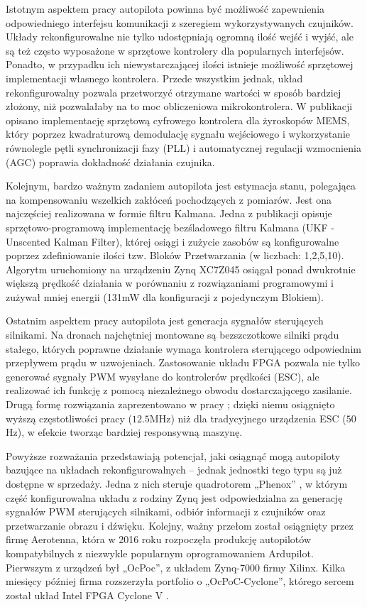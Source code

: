 Istotnym aspektem pracy autopilota powinna być możliwość zapewnienia odpowiedniego interfejsu komunikacji z szeregiem wykorzystywanych czujników. Układy rekonfigurowalne nie tylko udostępniają ogromną ilość wejść i wyjść, ale są też często wyposażone w sprzętowe kontrolery dla popularnych interfejsów. Ponadto, w przypadku ich niewystarczającej ilości istnieje możliwość sprzętowej implementacji własnego kontrolera. Przede wszystkim jednak, układ rekonfigurowalny pozwala przetworzyć otrzymane wartości w sposób bardziej złożony, niż pozwalałaby na to moc obliczeniowa mikrokontrolera. W publikacji \cite{MEMS} opisano implementację sprzętową cyfrowego kontrolera dla żyroskopów MEMS, który poprzez kwadraturową demodulację sygnału wejściowego i wykorzystanie równolegle pętli synchronizacji fazy (PLL) i automatycznej regulacji wzmocnienia (AGC) poprawia dokładność działania czujnika.

Kolejnym, bardzo ważnym zadaniem autopilota jest estymacja stanu, polegająca na kompensowaniu wszelkich zakłóceń pochodzących z pomiarów. Jest ona najczęściej realizowana w formie filtru Kalmana. Jedna z publikacji \cite{SohKalman} opisuje sprzętowo-programową implementację bezśladowego filtru Kalmana (UKF - Unscented Kalman Filter), której osiągi i zużycie zasobów są konfigurowalne poprzez zdefiniowanie ilości tzw. Bloków Przetwarzania (w liczbach: 1,2,5,10). Algorytm uruchomiony na urządzeniu Zynq XC7Z045 osiągał ponad dwukrotnie większą prędkość działania w porównaniu z rozwiązaniami programowymi i zużywał mniej energii (131mW dla konfiguracji z pojedynczym Blokiem). 

Ostatnim aspektem pracy autopilota jest generacja sygnałów sterujących silnikami. Na dronach najchętniej montowane są bezszczotkowe silniki prądu stałego, których poprawne działanie wymaga kontrolera sterującego odpowiednim przepływem prądu w uzwojeniach. Zastosowanie układu FPGA pozwala nie tylko generować sygnały PWM wysyłane do kontrolerów prędkości (ESC), ale realizować ich funkcję z pomocą niezależnego obwodu dostarczającego zasilanie. Drugą formę rozwiązania zaprezentowano w pracy \cite{ESC}; dzięki niemu osiągnięto wyższą częstotliwości pracy ($12.5$MHz) niż dla tradycyjnego urządzenia ESC ($50$Hz), w efekcie tworząc bardziej responsywną maszynę.

Powyższe rozważania przedstawiają potencjał, jaki osiągnąć mogą autopiloty bazujące na układach rekonfigurowalnych -- jednak jednostki tego typu są już dostępne w sprzedaży. Jedna z nich steruje quadrotorem „Phenox” \cite{Konomura}, w którym część konfigurowalna układu z rodziny Zynq jest odpowiedzialna za generację sygnałów PWM sterujących silnikami, odbiór informacji z czujników oraz przetwarzanie obrazu i dźwięku.
Kolejny, ważny przełom został osiągnięty przez firmę Aerotenna, która w 2016 roku rozpoczęła produkcję autopilotów kompatybilnych z niezwykle popularnym oprogramowaniem Ardupilot. Pierwszym z urządzeń był „OcPoc”, z układem Zynq-7000 firmy Xilinx. Kilka miesięcy później firma rozszerzyła portfolio o „OcPoC-Cyclone”, którego sercem został układ Intel FPGA Cyclone V \cite{Aerotenna}.

